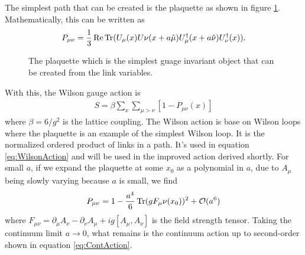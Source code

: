\documentclass[11pt]{article}
\begin{document}
The simplest path that can be created is the plaquette as shown in figure \ref{fig:Plaq}. Mathematically, this can be written as
\begin{align}
	P_{\mu\nu}=\frac{1}{3}\Re\Trace(U_\mu(x)U\nu(x+a\hat{\mu})U_\mu^\dagger(x+a\hat{\nu})U_\nu^\dagger(x)).
	\label{eq:Plaq}
\end{align}

\begin{figure}[h]
\centering
{}
\caption{The plaquette which is the simplest guage invariant object that can be created from the link variables.} \label{fig:Plaq}
\end{figure}
With this, the Wilson gauge action is
\begin{align}
	S=\beta\sum_x\sum_{\mu>\nu}[1-P_{\mu\nu}(x)]
	\label{eq:WilsonAction}
\end{align}
where $\beta=6/g^2$ is the lattice coupling. The Wilson action is base on Wilson loops where the plaquette is an example of the simplest Wilson loop. It is the normalized ordered product of links in a path. It's used in equation \ref{eq:WilsonAction} and will be used in the improved action derived shortly. For small $a$, if we expand the plaquette at some $x_0$ as a polynomial in $a$, due to $A_\mu$ being slowly varying because $a$ is small, we find
\begin{align}
	P_{\mu\nu}=1-\frac{a^4}{6}\Trace(gF_\mu\nu(x_0))^2+\mathcal{O}(a^6)
\end{align}
where $F_{\mu\nu}=\partial_\mu A_\nu-\partial_\nu A_\mu+ig[A_\mu,A_\nu]$ is the field strength tensor. Taking the continuum limit $a\to0$, what remains is the continuum action up to second-order shown in equation \ref{eq:ContAction}.
\end{document}
